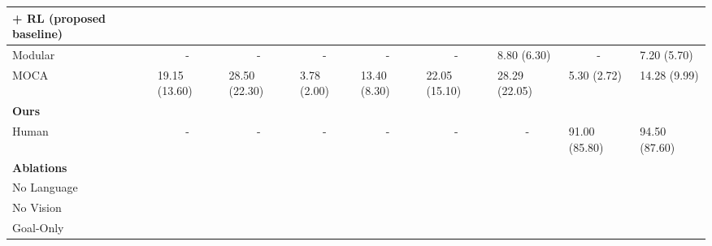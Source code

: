 \documentclass[11pt,a4paper]{article}
\begin{document}
\begin{table}[]
{\begin{tabular}{@{}lllllllll@{}}
+ RL (proposed baseline)                &    &          &     &          &     &                   &     &                         \\ \midrule
Modular \cite{corona2020modularity}          & \multicolumn{1}{c}{-}    & \multicolumn{1}{c}{-}         & \multicolumn{1}{c}{-}    & \multicolumn{1}{c}{-}         & \multicolumn{1}{c}{-}    & 8.80 (6.30)                   & \multicolumn{1}{c}{-}    & 7.20 (5.70)                   \\
MOCA \cite{singh2020moca}                     & 19.15 (13.60)            & 28.50 (22.30)                 & 3.78 (2.00)              & 13.40 (8.30)                  & 22.05 (15.10)            & 28.29 (22.05)                 & 5.30 (2.72)              & 14.28 (9.99)                  \\
\textbf{Ours}            &                          &                               &                          &                               &                          &                               &                          &                               \\ \midrule
Human                    & \multicolumn{1}{c}{-}    & \multicolumn{1}{c}{-}         & \multicolumn{1}{c}{-}    & \multicolumn{1}{c}{-}         & \multicolumn{1}{c}{-}    & \multicolumn{1}{c}{-}         & 91.00 (85.80)            & 94.50 (87.60)                 \\ \midrule
\textbf{Ablations} &                          &                               &                          &                               &                          &                               &                          &                               \\
No Language              &                          &                               &                          &                               &                          &                               &                          &                               \\
No Vision                &                          &                               &                          &                               &                          &                               &                          &                               \\
Goal-Only                &                          &                               &                          &                               &                          &                               &                          &                               \\

\end{tabular}}
\end{table}
\end{document}
